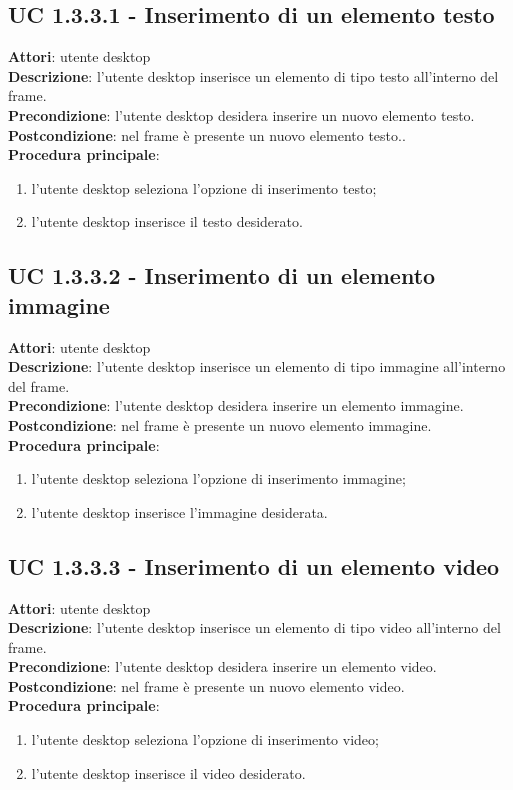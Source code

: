\subsection{UC 1.3.3.1 - Inserimento di un elemento testo}{
	\label{uc1.3.3.1}
	\textbf{Attori}: utente desktop \\
	\textbf{Descrizione}: l'utente desktop inserisce un elemento di tipo testo all'interno del frame. \\
	\textbf{Precondizione}: l'utente desktop desidera inserire un nuovo elemento testo.	\\
	\textbf{Postcondizione}: nel frame è presente un nuovo elemento testo..	\\
	\textbf{Procedura principale}:
	\begin{enumerate}
		\item l'utente desktop seleziona l'opzione di inserimento testo;
		\item l'utente desktop inserisce il testo desiderato.
	\end{enumerate}
	}
\subsection{UC 1.3.3.2 - Inserimento di un elemento immagine}{
	\label{uc1.3.3.2}
	\textbf{Attori}: utente desktop \\
	\textbf{Descrizione}: l'utente desktop inserisce un elemento di tipo immagine all'interno del frame. \\
	\textbf{Precondizione}: l'utente desktop desidera inserire un elemento immagine.	\\
	\textbf{Postcondizione}: nel frame è presente un nuovo elemento immagine.	\\
	\textbf{Procedura principale}:
	\begin{enumerate}
		\item l'utente desktop seleziona l'opzione di inserimento immagine;
		\item l'utente desktop inserisce l'immagine desiderata.
	\end{enumerate}
	}
\subsection{UC 1.3.3.3 - Inserimento di un elemento video}{
	\label{uc1.3.3.3}
	\textbf{Attori}: utente desktop \\
	\textbf{Descrizione}: l'utente desktop inserisce un elemento di tipo video all'interno del frame. \\
	\textbf{Precondizione}: l'utente desktop desidera inserire un elemento video.	\\
	\textbf{Postcondizione}: nel frame è presente un nuovo elemento video.	\\
	\textbf{Procedura principale}:
	\begin{enumerate}
		\item l'utente desktop seleziona l'opzione di inserimento video;
		\item l'utente desktop inserisce il video desiderato.
	\end{enumerate}
	}
